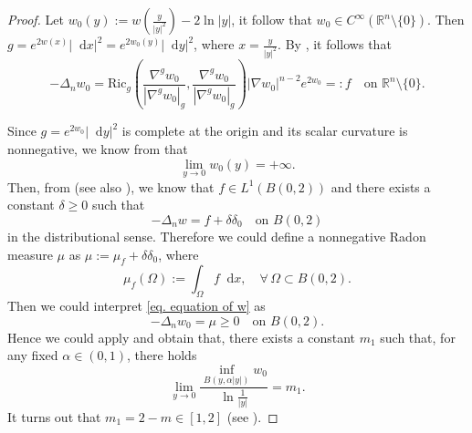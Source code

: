 \documentclass[12pt]{amsart}
\theoremstyle{plain}
\theoremstyle{definition}
\theoremstyle{remark}     %
\numberwithin{equation}{section}
\newcommand{\dx}{\mathop{}\!\mathrm{d}x}
\newcommand{\dy}{\mathop{}\!\mathrm{d}y}
\begin{document}
\begin{proof}
Let $w_0(y):=w(\frac{y}{|y|^2})-2\ln|y|$, it follow that $w_0\in C^{\infty}(\mathbb{R}^n\setminus\{0\})$. Then $g=e^{2w(x)}|\dx|^2=e^{2w_0(y)}|\dy|^2 $, where $x=\frac{y}{|y|^2}$. By \cite[(2.18)]{MQ}, it follows that
    \begin{equation}\label{eq. equation of w}
        -\Delta_n w_0
        =\mathrm{Ric}_g
        \left(\frac{\nabla^g w_0}{|\nabla^g w_0|_g},\frac{\nabla^g w_0}{|\nabla^g w_0|_g}\right)
            |\nabla w_0|^{n-2}e^{2w_0}=:f
            \quad \text{on } \mathbb{R}^n\setminus\{0\}.
    \end{equation}
    
    Since $g=e^{2w_0}|\dy|^2 $ is complete at the origin and its scalar curvature is nonnegative, we know from
    \cite[Proposition 8.1]{CHY04} that
    \[
        \lim_{y\to 0} w_0(y)=+\infty.
    \]
    Then, from \cite[proposition 1.1]{B-V89} (see also \cite[Theorem 2.4]{MQ}), we know that $f\in L^1(B(0,2))$ and there exists a constant $\delta\geq 0$ such that 
    \[
        -\Delta_n w=f+\delta\delta_0 \quad \text{on } B(0,2)
    \]
    in the distributional sense.
    Therefore we could define a nonnegative Radon measure $\mu$ as $\mu:=\mu_f+\delta \delta_0$, where
    \[
        \mu_f(\Omega):=
        \int_{\Omega}f\dx,\quad \forall\, \Omega\subset  B(0,2).
    \]
    Then we could interpret \cref{eq. equation of w} as
    \[
        -\Delta_n w_0=\mu\geq 0 \quad \text{on } B(0,2).
    \]
    Hence we could apply \cite[Lemma 3.7, Theorem 3.1]{MQ} and obtain that, there exists a constant $m_1$ such that, for any fixed $\alpha\in (0,1)$, there holds
    \begin{equation}\label{eq. lemma 3.7 of MQ}
        \lim_{y\to 0}\frac{\inf_{B(y,\alpha|y|)}w_0}{\ln\frac{1}{|y|}}
        =m_1.
    \end{equation}
    It turns out that $m_1=2-m\in [1,2]$ (see \cite[(5.5),(5.6)]{MQ}). 


\end{proof}
\end{document}
